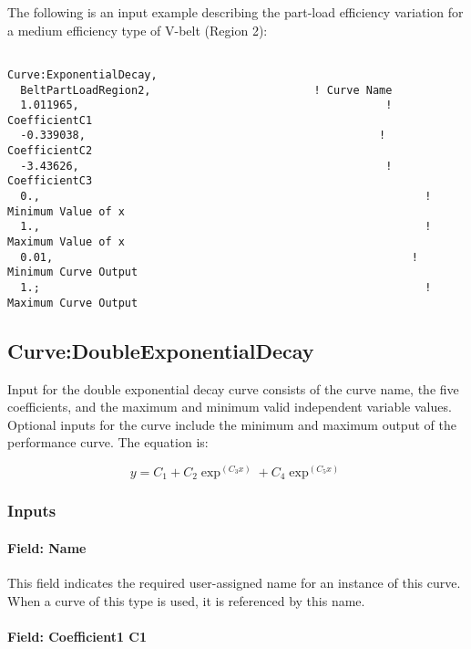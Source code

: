 The following is an input example describing the part-load efficiency variation for a medium efficiency type of V-belt (Region 2):

\begin{lstlisting}

Curve:ExponentialDecay,
  BeltPartLoadRegion2,                         ! Curve Name
  1.011965,                                               ! CoefficientC1
  -0.339038,                                             ! CoefficientC2
  -3.43626,                                               ! CoefficientC3
  0.,                                                           ! Minimum Value of x
  1.,                                                           ! Maximum Value of x
  0.01,                                                       ! Minimum Curve Output
  1.;                                                           ! Maximum Curve Output
\end{lstlisting}

\subsection{Curve:DoubleExponentialDecay}\label{curvedoubleexponentialdecay}

Input for the double exponential decay curve consists of the curve name, the five coefficients, and the maximum and minimum valid independent variable values. Optional inputs for the curve include the minimum and maximum output of the performance curve. The equation is:

\begin{equation}
y = {C_1} + {C_2}{\exp ^{({C_3}x)}} + {C_4}{\exp ^{({C_5}x)}}
\end{equation}

\subsubsection{Inputs}\label{inputs-18-005}

\paragraph{Field: Name}\label{field-name-18-004}

This field indicates the required user-assigned name for an instance of this curve. When a curve of this type is used, it is referenced by this name.

\paragraph{Field: Coefficient1 C1}\label{field-coefficient1-c1-5}

